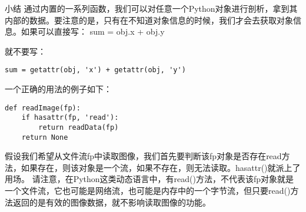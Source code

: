 \documentclass[twoside,11pt]{book}
\begin{document}
小结
通过内置的一系列函数，我们可以对任意一个Python对象进行剖析，拿到其内部的数据。要注意的是，只有在不知道对象信息的时候，我们才会去获取对象信息。如果可以直接写：
sum = obj.x + obj.y

就不要写：
\begin{lstlisting}
sum = getattr(obj, 'x') + getattr(obj, 'y')
\end{lstlisting}

一个正确的用法的例子如下：
\begin{lstlisting}
def readImage(fp):
    if hasattr(fp, 'read'):
        return readData(fp)
    return None
\end{lstlisting}

假设我们希望从文件流fp中读取图像，我们首先要判断该fp对象是否存在read方法，如果存在，则该对象是一个流，如果不存在，则无法读取。hasattr()就派上了用场。
请注意，在Python这类动态语言中，有read()方法，不代表该fp对象就是一个文件流，它也可能是网络流，也可能是内存中的一个字节流，但只要read()方法返回的是有效的图像数据，就不影响读取图像的功能。
\end{document}
